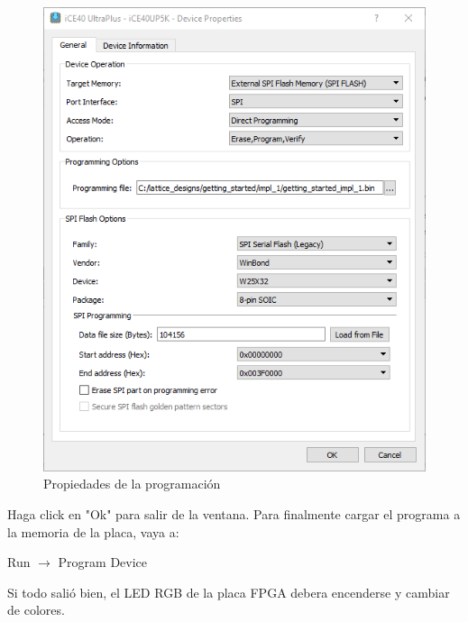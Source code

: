\documentclass[11pt, a4paper, oneside]{article}
\begin{document}
\begin{figure}[h!]
    \centering
    \includegraphics[scale=0.8]{figs/fig4.png}
    \caption{Propiedades de la programación}
    \label{fig4}
\end{figure}

Haga click en "Ok" para salir de la ventana. Para finalmente cargar el programa a la memoria de la placa, vaya a:
\begin{center}
 Run $\rightarrow$ Program Device
\end{center}
Si todo salió bien, el LED RGB de la placa FPGA debera encenderse y cambiar de colores.

\end{document}

